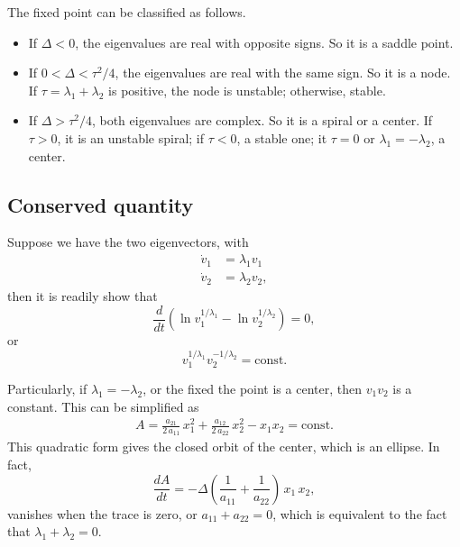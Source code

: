 \documentclass{book}
\begin{document}
The fixed point can be classified as follows.

\begin{itemize}

\item
If $\Delta < 0$, the eigenvalues are real with opposite signs.  So it is a saddle point.

\item
If $0 < \Delta < \tau^2/4$, the eigenvalues are real with the same sign.  So it is a node.  If $\tau = \lambda_1 + \lambda_2$ is positive, the node is unstable; otherwise, stable.

\item
If $\Delta > \tau^2/4$, both eigenvalues are complex.  So it is a spiral or a center.  If $\tau > 0$, it is an unstable spiral; if $\tau < 0$, a stable one; it $\tau = 0$ or $\lambda_1 = -\lambda_2$, a center.

\end{itemize}



\subsection{Conserved quantity}



Suppose we have the two eigenvectors, with
$$
\begin{aligned}
  \dot v_1 &= \lambda_1 v_1 \\
  \dot v_2 &= \lambda_2 v_2,
\end{aligned}
$$
then it is readily show that
$$
\frac{d}{dt} (\ln v_1^{1/\lambda_1} - \ln v_2^{1/\lambda_2}) = 0,
$$
or
$$
v_1^{1/\lambda_1} v_2^{-1/\lambda_2} = \mathrm{const.}
$$


Particularly, if $\lambda_1 = -\lambda_2$,
or the fixed the point is a center,
then $v_1 v_2$ is a constant.
This can be simplified as
\begin{align}
A =
\frac{a_{21}}{2 \, a_{11}} \, x_1^2
+\frac{a_{12}}{2 \, a_{22}} \, x_2^2
-x_1 x_2
= \mathrm{const.}
\label{eq:2lin_conserved}
\end{align}
This quadratic form gives the closed orbit of the center,
which is an ellipse.
%
In fact,
$$
\frac{dA}{dt}
=
-\Delta \left(\frac{1}{a_{11}} + \frac{1}{a_{22}} \right) \, x_1 \, x_2,
$$
vanishes when the trace is zero, or $a_{11} + a_{22} = 0$,
which is equivalent to the fact that $\lambda_1 + \lambda_2 = 0$.
\end{document}
